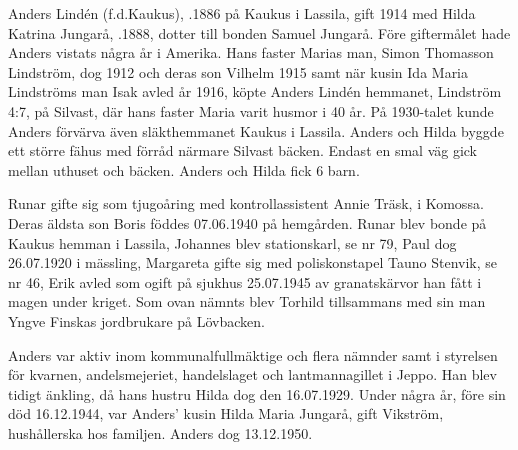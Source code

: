 Anders Lindén (f.d.Kaukus), .1886 på Kaukus i Lassila, gift 1914	med Hilda Katrina Jungarå, .1888, dotter till bonden Samuel Jungarå. Före giftermålet hade Anders vistats några år i Amerika. Hans faster Marias man, Simon Thomasson Lindström, dog 1912 och deras son Vilhelm 1915 samt när kusin Ida Maria Lindströms man Isak avled år 1916, köpte Anders Lindén hemmanet, Lindström 4:7, på Silvast, där hans faster Maria varit husmor i 40 år. På 1930-talet kunde Anders förvärva även släkthemmanet Kaukus i Lassila. Anders och Hilda byggde ett större fähus med förråd närmare Silvast bäcken. Endast en smal väg gick mellan uthuset och bäcken. Anders och Hilda fick 6 barn.
\begin{jhchildren}
  \item {}
  \item {}
  \item {}
  \item {}
  \item {}
  \item {}
\end{jhchildren}
Runar gifte sig som tjugoåring med kontrollassistent Annie Träsk,  i Komossa. Deras äldsta son Boris föddes 07.06.1940 på hemgården. Runar blev bonde på Kaukus hemman i Lassila, Johannes blev stationskarl, se nr 79, Paul dog 26.07.1920 i mässling, Margareta gifte sig med poliskonstapel Tauno Stenvik, se nr 46, Erik avled som ogift på sjukhus 25.07.1945 av granatskärvor han fått i magen under kriget. Som ovan nämnts blev Torhild tillsammans med sin man Yngve Finskas jordbrukare på Lövbacken.

Anders var aktiv inom kommunalfullmäktige och flera nämnder samt i styrelsen för kvarnen, andelsmejeriet, handelslaget och lantmannagillet i Jeppo. Han blev tidigt änkling, då hans hustru Hilda dog den 16.07.1929. Under några år, före sin död 16.12.1944, var Anders' kusin Hilda Maria Jungarå, gift Vikström, hushållerska hos familjen. Anders dog 13.12.1950.


